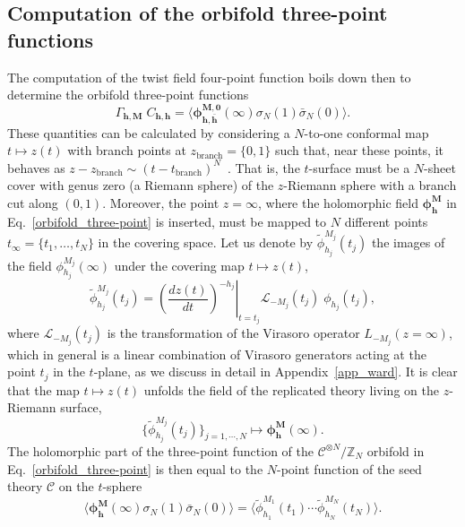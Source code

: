 \documentclass[a4paper,11pt]{article}
\begin{document}
\subsection{Computation of the orbifold three-point functions}
The computation of the twist field four-point function boils down then to determine the 
orbifold three-point functions
\begin{equation}\label{orbifold_three-point}
 \Gamma_{\boldsymbol{h},\boldsymbol{M}} \;C_{\boldsymbol{h},\boldsymbol{h}} = \langle \boldsymbol{\phi}^{\boldsymbol{M},\boldsymbol{0}}_{\boldsymbol{h},\boldsymbol{\bar{h}}}(\infty) \sigma_{N}(1)\bar{\sigma}_{N}(0)\rangle.
\end{equation}
These quantities can be calculated by considering a $N$-to-one conformal map
$t\mapsto z(t)$ with branch points at $z_{\text{branch}}=\{0, 1\}$ such that, 
near these points, it behaves as $z-z_{\text{branch}}\sim (t-t_{\text{branch}})^N$~\cite{Lunin}.
That is, the $t$-surface must be a $N$-sheet cover with genus zero (a Riemann sphere) of the $z$-Riemann sphere with a branch cut along 
$(0,1)$.  Moreover, the point $z=\infty$, where the holomorphic field $\boldsymbol{\phi}^{\boldsymbol{M}}_{\boldsymbol{h}}$
in Eq.~\eqref{orbifold_three-point} is inserted, must be mapped to $N$ different points $t_\infty=\{t_1, \dots, t_N\}$ in 
the covering space. Let us denote by $\tilde{\phi}_{h_j}^{M_j}(t_j)$ the images
of the field $\phi_{h_j}^{M_j}(\infty)$ under the covering map $t\mapsto z(t)$,
\begin{equation}
\label{Jac}
\tilde{\phi}_{h_j}^{M_j}(t_j) = \left.\left(\frac{d z(t)}{d t}
 \right)^{-h_j}\right|_{t=t_j} \mathcal{L}_{-M_j}(t_j)\;\phi_{h_j} (t_j),
\end{equation}
where $\mathcal{L}_{-M_j}(t_j)$ is the transformation of the Virasoro operator
$L_{-M_j}(z=\infty)$, which in general is a linear combination of Virasoro generators
acting at the point $t_j$ in the $t$-plane, as we discuss in detail in Appendix~\ref{app_ward}.
It is clear that the map $t\mapsto z(t)$ unfolds the field of the replicated theory living on the $z$- Riemann surface,
\begin{equation}
\{\tilde{\phi}_{h_j}^{M_j}(t_j)\}_{j=1,\cdots,N}\mapsto \boldsymbol{\phi}_{\boldsymbol{h}}^{\boldsymbol{M}}(\infty).
\end{equation}
The holomorphic part of the three-point function of the $\mathcal{C}^{\otimes N}/\mathbb{Z}_N$ orbifold in Eq.~\eqref{orbifold_three-point}
is then equal to the $N$-point function of the seed theory $\mathcal{C}$ on the $t$-sphere
\begin{equation}\label{N-point}
\langle \boldsymbol{\phi}^{\boldsymbol{M}}_{\boldsymbol{h}}(\infty) \sigma_{N}(1)\bar{\sigma}_{N}(0)\rangle=\langle \tilde{\phi}^{M_1}_{h_1}(t_1)\cdots\tilde{\phi}_{h_N}^{M_N}(t_N)\rangle.
\end{equation}
\end{document}
